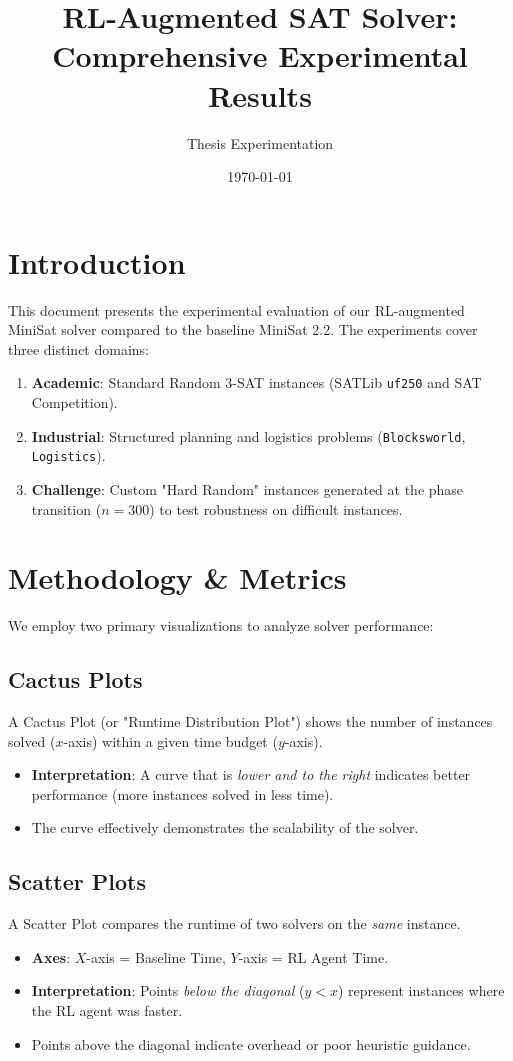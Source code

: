 \documentclass[11pt, a4paper]{article}
\title{\textbf{RL-Augmented SAT Solver: Comprehensive Experimental Results}}
\author{Thesis Experimentation}
\date{\today}
\begin{document}
\maketitle

\section{Introduction}
This document presents the experimental evaluation of our RL-augmented MiniSat solver compared to the baseline MiniSat 2.2. The experiments cover three distinct domains:
\begin{enumerate}
    \item \textbf{Academic}: Standard Random 3-SAT instances (SATLib \texttt{uf250} and SAT Competition).
    \item \textbf{Industrial}: Structured planning and logistics problems (\texttt{Blocksworld}, \texttt{Logistics}).
    \item \textbf{Challenge}: Custom "Hard Random" instances generated at the phase transition ($n=300$) to test robustness on difficult instances.
\end{enumerate}

\section{Methodology \& Metrics}
We employ two primary visualizations to analyze solver performance:

\subsection{Cactus Plots}
A Cactus Plot (or "Runtime Distribution Plot") shows the number of instances solved ($x$-axis) within a given time budget ($y$-axis). 
\begin{itemize}
    \item \textbf{Interpretation}: A curve that is \textit{lower and to the right} indicates better performance (more instances solved in less time).
    \item The curve effectively demonstrates the scalability of the solver.
\end{itemize}

\subsection{Scatter Plots}
A Scatter Plot compares the runtime of two solvers on the \textit{same} instance.
\begin{itemize}
    \item \textbf{Axes}: $X$-axis = Baseline Time, $Y$-axis = RL Agent Time.
    \item \textbf{Interpretation}: Points \textit{below the diagonal} ($y < x$) represent instances where the RL agent was faster.
    \item Points above the diagonal indicate overhead or poor heuristic guidance.
\end{itemize}
\end{document}
